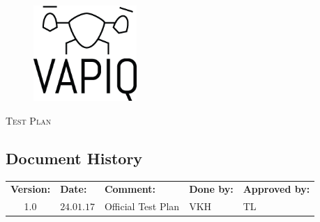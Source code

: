\documentclass{article}
\author{Aleksander Holthe  \\ Katrine Sundal Haune \\ Kent Kjeldaas \\ Stian Fredriksen \\ Tomas Lyngroth \\ Vanja Katinka Halvorsen}
\makeatletter
\let\vapiqteam\@author
\makeatother
\begin{document}
\begin{titlepage}
    \centering
    \pagecolor{gainsboro}
	\\[3.0 cm]
    \begin{figure}[h]
        \centering
        \includegraphics[width = 0.35\textwidth]{VAPIQ-PICTURES//Logo2_Tilted.png}
        \\[2.0 cm] 
    \end{figure}                              
    \textsc{\Huge Test Plan}  
    \\[4 cm]
	\large \vapiqteam      
\end{titlepage}
\pagecolor{white}


\begin{center}
\section*{\textbf{Document History}}
\begin{tabular}{cllll}
\rowcolor{cadetgrey}
\textbf{Version:}    &\textbf{Date:} 	 &\textbf{Comment:}    &\textbf{Done by:}   &\textbf{Approved by:}  \\
1.0       & $24.01.17$   & Official Test Plan & VKH & TL \\
\end{tabular}                                                                   
\end{center}
\end{document}
